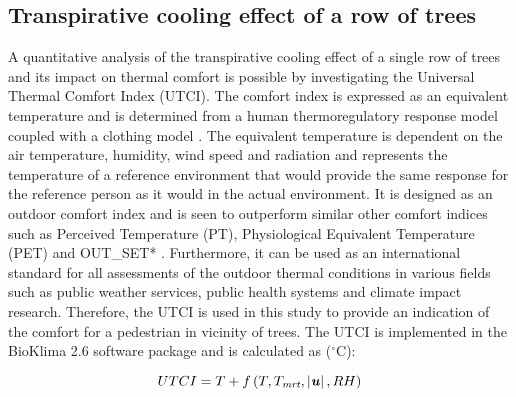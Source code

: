 \subsection{Transpirative cooling effect of a row of trees}

A quantitative analysis of the transpirative cooling effect of a single row of trees and its impact on thermal comfort is possible by investigating the Universal Thermal Comfort Index (UTCI). The comfort index is expressed as an equivalent temperature and is determined from a human thermoregulatory response model coupled with a clothing model \citep{Fiala2001}. The equivalent temperature is dependent on the air temperature, humidity, wind speed and radiation and represents the temperature of a reference environment that would provide the same response for the reference person as it would in the actual environment. It is designed as an outdoor comfort index and is seen to outperform similar other comfort indices such as Perceived Temperature (PT), Physiological Equivalent Temperature (PET) and OUT\_SET* \citep{Jendritzky2012}. Furthermore, it can be used as an international standard for all assessments of the outdoor thermal conditions in various fields such as public weather services, public health systems and climate impact research. Therefore, the UTCI is used in this study to provide an indication of the comfort for a pedestrian in vicinity of trees. The UTCI is implemented in the BioKlima 2.6 software package and is calculated as ($^{\circ}$C):

\begin{equation}
UTCI = T + f \left(T,{T_{\textit{mrt}}},\left| \textbf{\textit{u}}  \right|,RH\right)
\label{eq:UTCI}
\end{equation}

